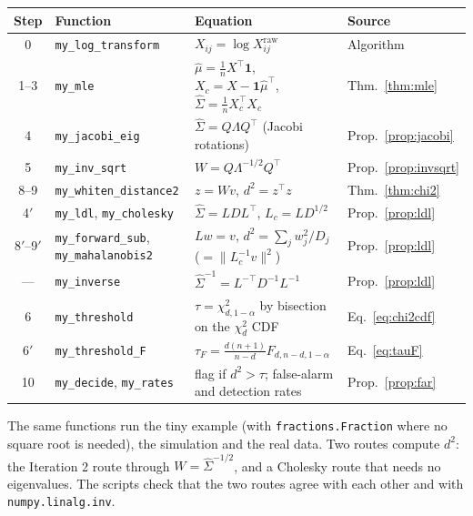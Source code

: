 \documentclass[11pt]{article}
\theoremstyle{definition}
\newcommand{\T}{^{\top}}
\begin{document}
\begin{center}
\small
\begin{tabular}{@{}clp{6.3cm}l@{}}
\toprule
Step & Function & Equation & Source \\
\midrule
0 & \texttt{my\_log\_transform} & $X_{ij}=\log X^{\text{raw}}_{ij}$ & Algorithm \\
1--3 & \texttt{my\_mle} & $\hat\mu=\frac1nX\T\mathbf 1$, $X_c=X-\mathbf 1\hat\mu\T$, $\hat\Sigma=\frac1nX_c\T X_c$ & Thm.~\ref{thm:mle} \\
4 & \texttt{my\_jacobi\_eig} & $\hat\Sigma=Q\Lambda Q\T$ (Jacobi rotations) & Prop.~\ref{prop:jacobi} \\
5 & \texttt{my\_inv\_sqrt} & $W=Q\Lambda^{-1/2}Q\T$ & Prop.~\ref{prop:invsqrt} \\
8--9 & \texttt{my\_whiten\_distance2} & $z=Wv$, $d^2=z\T z$ & Thm.~\ref{thm:chi2} \\
4$'$ & \texttt{my\_ldl}, \texttt{my\_cholesky} & $\hat\Sigma=LDL\T$, $L_c=LD^{1/2}$ & Prop.~\ref{prop:ldl} \\
8$'$--9$'$ & \texttt{my\_forward\_sub}, \texttt{my\_mahalanobis2} & $Lw=v$, $d^2=\sum_jw_j^2/D_j$ ($=\|L_c^{-1}v\|^2$) & Prop.~\ref{prop:ldl} \\
--- & \texttt{my\_inverse} & $\hat\Sigma^{-1}=L^{-\top}D^{-1}L^{-1}$ & Prop.~\ref{prop:ldl} \\
6 & \texttt{my\_threshold} & $\tau=\chi^2_{d,1-\alpha}$ by bisection on the $\chi^2_d$ CDF & Eq.~\eqref{eq:chi2cdf} \\
6$'$ & \texttt{my\_threshold\_F} & $\tau_F=\frac{d(n+1)}{n-d}F_{d,n-d,1-\alpha}$ & Eq.~\eqref{eq:tauF} \\
10 & \texttt{my\_decide}, \texttt{my\_rates} & flag if $d^2>\tau$; false-alarm and detection rates & Prop.~\ref{prop:far} \\
\bottomrule
\end{tabular}
\end{center}

The same functions run the tiny example (with \texttt{fractions.Fraction} where no square root is needed), the simulation and the real data. Two routes compute $d^2$: the Iteration 2 route through $W=\hat\Sigma^{-1/2}$, and a Cholesky route that needs no eigenvalues. The scripts check that the two routes agree with each other and with \texttt{numpy.linalg.inv}.
\end{document}
